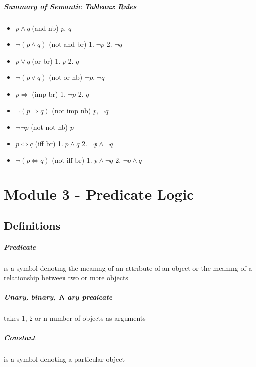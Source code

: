 \documentclass[12pt]{report}
\begin{document}
    \paragraph{Summary of Semantic Tableaux Rules}
      \begin{itemize}
        \item $ p \land q $ (and nb) $p$, $q$
        \item $ \lnot ( p \land q ) $ (not and br) 1. $ \lnot p $ 2. $ \lnot q $
        \item $ p \lor q $ (or br) 1. $p$ 2. $q$
        \item $ \lnot ( p \lor q ) $ (not or nb) $ \lnot p $, $ \lnot q $
        \item $ p \Rightarrow $ (imp br) 1. $ \lnot p $ 2. $ q $
        \item $ \lnot ( p \Rightarrow q ) $ (not imp nb) $p$, $\lnot q$
        \item $ \lnot \lnot p $ (not not nb) $ p $
        \item $ p \Leftrightarrow q $ (iff br) 1. $ p \land q $ 2. $ \lnot p
          \land \lnot q $
        \item $ \lnot ( p \Leftrightarrow q ) $ (not iff br) 1. $ p \land
          \lnot q $ 2. $ \lnot p \land q $
      \end{itemize}

\chapter{Module 3 - Predicate Logic}
  \section{Definitions}
    \paragraph{Predicate} is a symbol denoting the meaning of an attribute of
    an object or the meaning of a relationship between two or more objects

    \paragraph{Unary, binary, N ary predicate} takes 1, 2 or n number of
    objects as arguments

    \paragraph{Constant} is a symbol denoting a particular object
\end{document}
